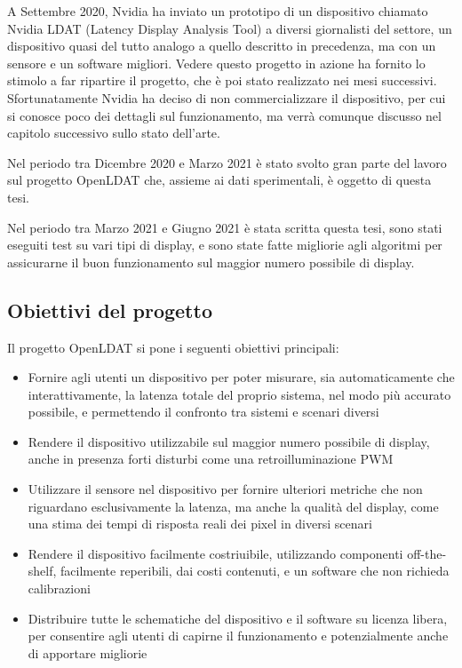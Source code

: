 A Settembre 2020, Nvidia ha inviato un prototipo di un dispositivo chiamato Nvidia LDAT (Latency Display Analysis Tool) a diversi giornalisti del settore\cite{gamersnexus_nvidialdat}, un dispositivo quasi del tutto analogo a quello descritto in precedenza, ma con un sensore e un software migliori. Vedere questo progetto in azione ha fornito lo stimolo a far ripartire il progetto, che è poi stato realizzato nei mesi successivi. Sfortunatamente Nvidia ha deciso di non commercializzare il dispositivo, per cui si conosce poco dei dettagli sul funzionamento, ma verrà comunque discusso nel capitolo successivo sullo stato dell'arte.

Nel periodo tra Dicembre 2020 e Marzo 2021 è stato svolto gran parte del lavoro sul progetto OpenLDAT che, assieme ai dati sperimentali, è oggetto di questa tesi.

Nel periodo tra Marzo 2021 e Giugno 2021 è stata scritta questa tesi, sono stati eseguiti test su vari tipi di display, e sono state fatte migliorie agli algoritmi per assicurarne il buon funzionamento sul maggior numero possibile di display.

\subsection{Obiettivi del progetto}
Il progetto OpenLDAT si pone i seguenti obiettivi principali:
\begin{itemize}
	\item Fornire agli utenti un dispositivo per poter misurare, sia automaticamente che interattivamente, la latenza totale del proprio sistema, nel modo più accurato possibile, e permettendo il confronto tra sistemi e scenari diversi
	\item Rendere il dispositivo utilizzabile sul maggior numero possibile di display, anche in presenza forti disturbi come una retroilluminazione PWM
	\item Utilizzare il sensore nel dispositivo per fornire ulteriori metriche che non riguardano esclusivamente la latenza, ma anche la qualità del display, come una stima dei tempi di risposta reali dei pixel in diversi scenari
	\item Rendere il dispositivo facilmente costriuibile, utilizzando componenti off-the-shelf, facilmente reperibili, dai costi contenuti, e un software che non richieda calibrazioni
	\item Distribuire tutte le schematiche del dispositivo e il software su licenza libera, per consentire agli utenti di capirne il funzionamento e potenzialmente anche di apportare migliorie
\end{itemize}

